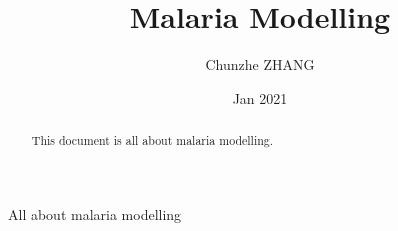 \documentclass[12pt, letterpaper]{article}
\title{Malaria Modelling}
\author{Chunzhe ZHANG}
\date{Jan 2021}
\begin{document}
\begin{titlepage}
	\maketitle
\end{titlepage}
\begin{abstract}
	This document is all about malaria modelling.
\end{abstract}
All about malaria modelling
\end{document}
